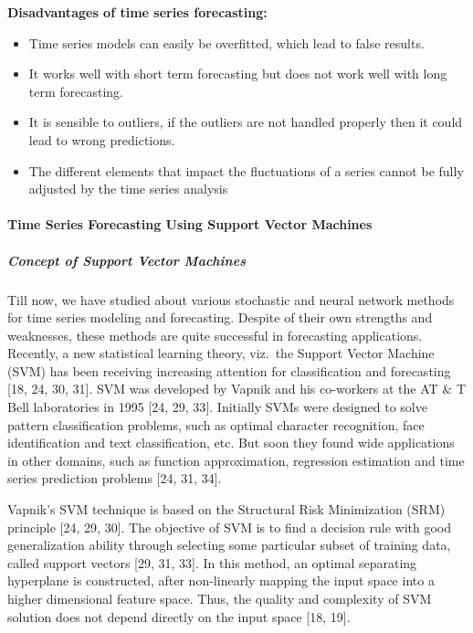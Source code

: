 \documentclass[
  letterpaper,
  DIV=11,
  numbers=noendperiod]{scrartcl}
\let\oldparagraph\paragraph
\renewcommand{\paragraph}[1]{\oldparagraph{#1}\mbox{}}
\let\oldsubparagraph\subparagraph
\renewcommand{\subparagraph}[1]{\oldsubparagraph{#1}\mbox{}}
\begin{document}
\textbf{Disadvantages of time series forecasting:}

\begin{itemize}
\item
  Time series models can easily be overfitted, which lead to false
  results.
\item
  It works well with short term forecasting but does not work well with
  long term forecasting.
\item
  It is sensible to outliers, if the outliers are not handled properly
  then it could lead to wrong predictions.
\item
  The different elements that impact the fluctuations of a series cannot
  be fully adjusted by the time series analysis
\end{itemize}

\hypertarget{time-series-forecasting-using-support-vector-machines}{%
\paragraph{\texorpdfstring{\textbf{Time Series Forecasting Using Support
Vector
Machines}}{Time Series Forecasting Using Support Vector Machines}}\label{time-series-forecasting-using-support-vector-machines}}

\hypertarget{concept-of-support-vector-machines}{%
\subparagraph{\texorpdfstring{\textbf{Concept of Support Vector
Machines}}{Concept of Support Vector Machines}}\label{concept-of-support-vector-machines}}

Till now, we have studied about various stochastic and neural network
methods for time series modeling and forecasting. Despite of their own
strengths and weaknesses, these methods are quite successful in
forecasting applications. Recently, a new statistical learning theory,
viz.~the Support Vector Machine (SVM) has been receiving increasing
attention for classification and forecasting {[}18, 24, 30, 31{]}. SVM
was developed by Vapnik and his co-workers at the AT \& T Bell
laboratories in 1995 {[}24, 29, 33{]}. Initially SVMs were designed to
solve pattern classification problems, such as optimal character
recognition, face identification and text classification, etc. But soon
they found wide applications in other domains, such as function
approximation, regression estimation and time series prediction problems
{[}24, 31, 34{]}.

Vapnik's SVM technique is based on the Structural Risk Minimization
(SRM) principle {[}24, 29, 30{]}. The objective of SVM is to find a
decision rule with good generalization ability through selecting some
particular subset of training data, called support vectors {[}29, 31,
33{]}. In this method, an optimal separating hyperplane is constructed,
after non-linearly mapping the input space into a higher dimensional
feature space. Thus, the quality and complexity of SVM solution does not
depend directly on the input space {[}18, 19{]}.
\end{document}
